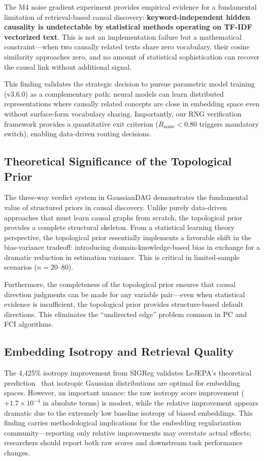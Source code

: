 \documentclass[11pt,a4paper]{article}
\begin{document}
The M4 noise gradient experiment provides empirical evidence for a fundamental limitation of retrieval-based causal discovery: \textbf{keyword-independent hidden causality is undetectable by statistical methods operating on TF-IDF vectorized text}. This is not an implementation failure but a mathematical constraint---when two causally related texts share zero vocabulary, their cosine similarity approaches zero, and no amount of statistical sophistication can recover the causal link without additional signal.

This finding validates the strategic decision to pursue parametric model training (v3.6.0) as a complementary path: neural models can learn distributed representations where causally related concepts are close in embedding space even without surface-form vocabulary sharing. Importantly, our RNG verification framework provides a quantitative exit criterion (\(R_{\text{noise}} < 0.80\) triggers mandatory switch), enabling data-driven routing decisions.

\subsection{Theoretical Significance of the Topological Prior}

The three-way verdict system in GaussianDAG demonstrates the fundamental value of structured priors in causal discovery. Unlike purely data-driven approaches that must learn causal graphs from scratch, the topological prior provides a complete structural skeleton. From a statistical learning theory perspective, the topological prior essentially implements a favorable shift in the bias-variance tradeoff: introducing domain-knowledge-based bias in exchange for a dramatic reduction in estimation variance. This is critical in limited-sample scenarios (\(n = 20\)--\(80\)).

Furthermore, the completeness of the topological prior ensures that causal direction judgments can be made for any variable pair---even when statistical evidence is insufficient, the topological prior provides structure-based default directions. This eliminates the ``undirected edge'' problem common in PC and FCI algorithms.

\subsection{Embedding Isotropy and Retrieval Quality}

The 4,425\% isotropy improvement from SIGReg validates LeJEPA's theoretical prediction~\cite{lejepa2025} that isotropic Gaussian distributions are optimal for embedding spaces. However, an important nuance: the raw isotropy score improvement (\(+1.7 \times 10^{-4}\) in absolute terms) is modest, while the relative improvement appears dramatic due to the extremely low baseline isotropy of biased embeddings. This finding carries methodological implications for the embedding regularization community---reporting only relative improvements may overstate actual effects; researchers should report both raw scores and downstream task performance changes.
\end{document}

